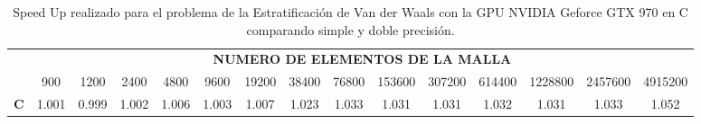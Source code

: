 \begin{table}[]
\begin{tabular}{|c|c|c|c|c|c|c|c|c|c|c|c|c|c|c|}
\hline
\multirow{2}{*}{} & \multicolumn{14}{c|}{\textbf{NUMERO DE ELEMENTOS DE LA MALLA}}                                                         \\ \cline{2-15} 
                  & 900   & 1200  & 2400  & 4800  & 9600  & 19200 & 38400 & 76800 & 153600 & 307200 & 614400 & 1228800 & 2457600 & 4915200 \\ \hline
\textbf{C}        & 1.001 & 0.999 & 1.002 & 1.006 & 1.003 & 1.007 & 1.023 & 1.033 & 1.031  & 1.031  & 1.032  & 1.031   & 1.033   & 1.052   \\ \hline
\end{tabular}
\caption{Speed Up realizado para el problema de la Estratificación de Van der Waals con la GPU NVIDIA Geforce GTX 970 en C comparando simple y doble precisión.}
\label{tab:c_760_VdW_c_10}
\end{table}